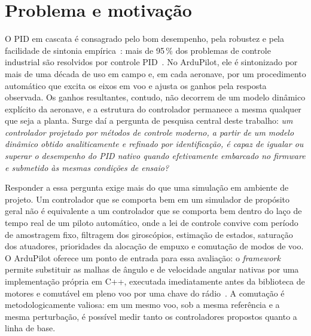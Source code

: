 \section{Problema e motivação}
\label{sec:motivacao}

O PID em cascata é consagrado pelo bom desempenho, pela robustez e pela
facilidade de sintonia empírica~\cite[Cap.~10]{astrom2008}: mais de 95\,\%
dos problemas de controle industrial são resolvidos por controle
PID~\cite[Cap.~1]{astrom2008}. No ArduPilot, ele é
sintonizado por mais de uma década de uso em campo e, em cada aeronave, por um
procedimento automático que excita os eixos em voo e ajusta os ganhos pela
resposta observada. Os ganhos resultantes, contudo, não decorrem de um modelo
dinâmico explícito da aeronave, e a estrutura do controlador permanece a mesma
qualquer que seja a planta. Surge daí a pergunta de pesquisa central deste
trabalho: \emph{um controlador projetado por métodos de controle moderno, a
partir de um modelo dinâmico obtido analiticamente e refinado por
identificação, é capaz de igualar ou superar o desempenho do PID nativo quando
efetivamente embarcado no firmware e submetido às mesmas condições de ensaio?}

Responder a essa pergunta exige mais do que uma simulação em ambiente de
projeto. Um controlador que se comporta bem em um simulador de propósito geral
não é equivalente a um controlador que se comporta bem dentro do laço de tempo
real de um piloto automático, onde a lei de controle convive com período de
amostragem fixo, filtragem dos giroscópios, estimação de estados, saturação
dos atuadores, prioridades da alocação de empuxo e comutação de modos de voo.
O ArduPilot oferece um ponto de entrada para essa avaliação: o
\textit{framework}  permite substituir as malhas de
ângulo e de velocidade angular nativas por uma implementação própria em C++,
executada imediatamente antes da biblioteca de motores e comutável em pleno
voo por uma chave do rádio~\cite{ardupilot2026}. A comutação é
metodologicamente valiosa: em um mesmo voo, sob a mesma referência e a mesma
perturbação, é possível medir tanto os controladores propostos quanto a linha
de base.

